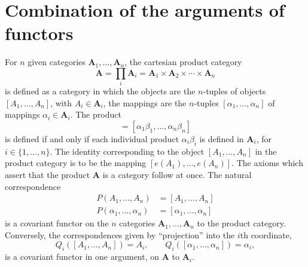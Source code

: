 \documentclass[11pt,a4paper]{report}
\begin{document}
\section{Combination of the arguments of functors}\label{sec:func_comb}
For $n$ given categories $\mathbf{A}_1,\dotsc,\mathbf{A}_n$, the cartesian product category
\begin{equation}\label{eq:prod_cat}
	\mathbf{A}=\prod_i\mathbf{A}_i=\mathbf{A}_1\times\mathbf{A}_2\times\dotsm\times\mathbf{A}_n
\end{equation}
is defined as a category in which the objects are the $n$-tuples of objects $[A_1,\dotsc,A_n]$, with
$A_i\in\mathbf{A}_i$, the mappings are the $n$-tuples $[\alpha_1,\dotsc,\alpha_n]$ of mappings
$\alpha_i\in\mathbf{A}_i$. The product
\begin{equation*}
	[\alpha_1,\dotsc,\alpha_n][\beta_1,\dotsc,\beta_n]=[\alpha_1\beta_1,\dotsc,\alpha_n\beta_n]
\end{equation*}
is defined if and only if each individual product $\alpha_i\beta_i$ is defined in $\mathbf{A}_i$, for
$i\in\{1,\dotsc,n\}$. The identity corresponding to the object $[A_1,\dotsc,A_n]$ in the product category
is to be the mapping $[e(A_1),\dotsc,e(A_n)]$. The axioms which assert that the product $\mathbf{A}$
is a category follow at once. The natural correspondence
\begin{align}
	P(A_1,\dotsc,A_n) &= [A_1,\dotsc,A_n]\label{eq:prod_cat1}\\
	P(\alpha_1,\dotsc,\alpha_n) &= [\alpha_1,\dotsc,\alpha_n]\label{eq:prod_cat2}
\end{align}
is a covariant functor on the $n$ categories $\mathbf{A}_1,\dotsc,\mathbf{A}_n$ to the product category.
Conversely, the correspondences given by ``projection'' into the $i$th coordinate,
\begin{equation}\label{eq:prod_proj}
	Q_i([A_1,\dotsc,A_n])=A_i,\qquad Q_i([\alpha_1,\dotsc,\alpha_n])=\alpha_i,
\end{equation}
is a covariant functor in one argument, on $\mathbf{A}$ to $\mathbf{A}_i$.
\end{document}
